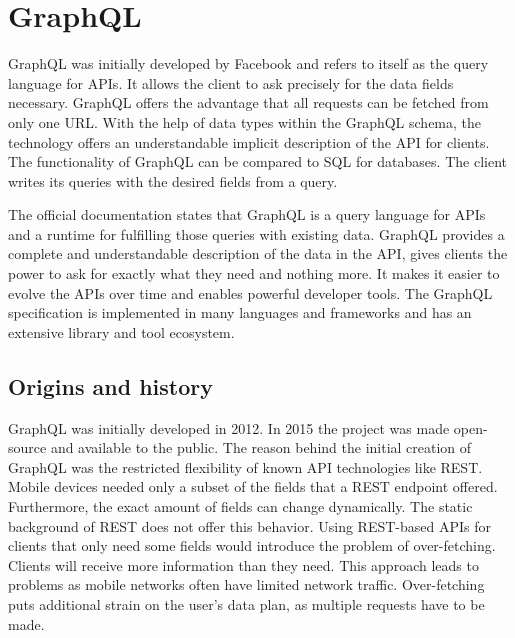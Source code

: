 \section{GraphQL}\label{section:background:graphql}

GraphQL was initially developed by Facebook and refers to itself as the query language for \acp{API}. It allows the client to ask precisely for the data fields necessary. GraphQL offers the advantage that all requests can be fetched from only one \ac{URL}. With the help of data types within the GraphQL schema, the technology offers an understandable implicit description of the \ac{API} for clients. \cite{misc:-:background:graphql:graphql-org} The functionality of GraphQL can be compared to \ac{SQL} for databases. The client writes its queries with the desired fields from a query.

\bigskip

\noindent The official documentation states that GraphQL is a query language for \acp{API} and a runtime for fulfilling those queries with existing data. GraphQL provides a complete and understandable description of the data in the \ac{API}, gives clients the power to ask for exactly what they need and nothing more. It makes it easier to evolve the \acp{API} over time and enables powerful developer tools. The GraphQL specification is implemented in many languages and frameworks and has an extensive library and tool ecosystem.

\subsection{Origins and history}\label{subsection:background:graphql:origins-and-history}

GraphQL was initially developed in 2012. In 2015 the project was made open-source and available to the public. The reason behind the initial creation of GraphQL was the restricted flexibility of known \ac{API} technologies like \ac{REST}. Mobile devices needed only a subset of the fields that a \ac{REST} endpoint offered. Furthermore, the exact amount of fields can change dynamically. The static background of \ac{REST} does not offer this behavior. Using \ac{REST}-based \acp{API} for clients that only need some fields would introduce the problem of over-fetching. Clients will receive more information than they need. This approach leads to problems as mobile networks often have limited network traffic. Over-fetching puts additional strain on the user's data plan, as multiple requests have to be made. \cite{misc:2015:bryon:background:graphql:graphql-query-language}

